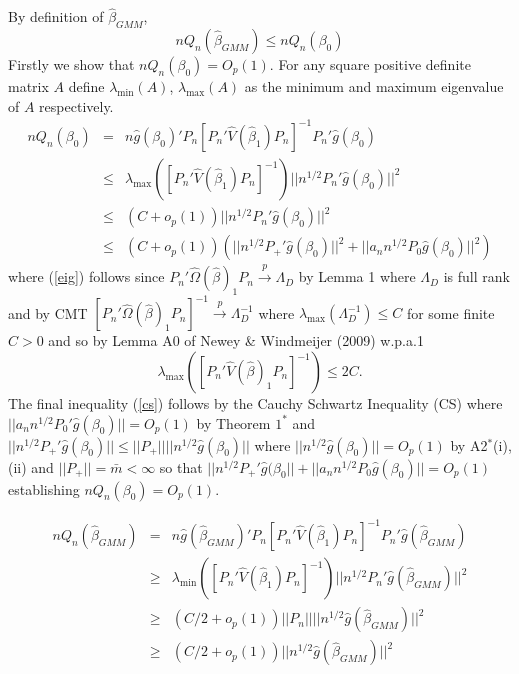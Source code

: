 \documentclass[11pt, fleqn]{article}
\begin{document}
By definition of $\hat{\beta}_{GMM}$,
\begin{equation} nQ_{n}(\hat{\beta}_{GMM})\leq  nQ_{n}(\beta_0)\end{equation}
Firstly we show that $nQ_{n}(\beta_0)=O_p(1)$. For any square positive definite matrix $A$ define $\lambda_{\min}(A)$, $\lambda_{\max}(A)$ as the minimum and maximum eigenvalue of $A$ respectively.
\begin{eqnarray}
nQ_n(\beta_0)&=&n\hat{g}(\beta_0)'P_n[P_n'\hat{V}(\hat{\beta}_1)P_n]^{-1}P_n'\hat{g}(\beta_0)  \label{ok}\\
&\leq & \lambda_{\max}\left([P_n'\hat{V}(\hat{\beta}_1)P_n]^{-1}\right)|\!|n^{1/2}P_n'\hat{g}(\beta_0)|\!|^2 \\
&\leq &(C+o_p(1))|\!|n^{1/2}P_n'\hat{g}(\beta_0)|\!|^2 \label{eig}\\
&\leq  &(C+o_p(1))\left(|\!|n^{1/2}P_+'\hat{g}(\beta_0)|\!|^2 +|\!|a_nn^{1/2}P_0\hat{g}(\beta_0)|\!|^2\right)\label{cs}
\end{eqnarray} 
where (\ref{eig}) follows since  $P_n'\hat{\Omega}(\hat{\beta})_1P_n\overset{p}{\rightarrow} \Lambda_D$  by Lemma 1 where $\Lambda_D$ is full rank and by CMT $[P_n'\hat{\Omega}(\hat{\beta})_1P_n]^{-1}\overset{p}{\rightarrow} \Lambda_D^{-1}$ where $\lambda_{\max}(\Lambda_D^{-1})\leq C$ for some finite $C>0$ and so by Lemma A0 of Newey \& Windmeijer (2009) w.p.a.1
\begin{equation}\lambda_{\max}([P_n'\hat{V}(\hat{\beta})_1P_n]^{-1})\leq 2C. \end{equation}
The final inequality (\ref{cs}) follows by the Cauchy Schwartz Inequality (CS) where\\
$ |\!|a_nn^{1/2}P_0'\hat{g}(\beta_0)|\!| =O_p(1)$ by Theorem $1^*$ and $
 |\!|n^{1/2}P_+'\hat{g}(\beta_0)|\!|\leq |\!|P_+|\!| |\!|n^{1/2}\hat{g}(\beta_0)|\!|$ where $|\!|n^{1/2}\hat{g}(\beta_0)|\!|=O_p(1)$ by A2$^*$(i), (ii) and $|\!|P_+|\!|=\bar{m}<\infty$ so that $|\!|n^{1/2}P_+'\hat{g}(\beta_0|\!|+|\!|a_nn^{1/2}P_0\hat{g}(\beta_0)|\!|=O_p(1)$ establishing $nQ_n(\beta_0)=O_p(1)$.
 

  \begin{eqnarray}
 nQ_n(\hat{\beta}_{GMM})
 &=&n\hat{g}(\hat{\beta}_{GMM})'P_n[P_n'\hat{V}(\hat{\beta}_1)P_n]^{-1}P_n'\hat{g}(\hat{\beta}_{GMM}) \\
 &\geq&\lambda_{\min}\left([P_n'\hat{V}(\hat{\beta}_1)P_n]^{-1}\right) |\!|n^{1/2}P_n'\hat{g}(\hat{\beta}_{GMM})|\!|^2\\
  &\geq& (C/2+o_p(1))|\!|P_n|\!||\!|n^{1/2}\hat{g}(\hat{\beta}_{GMM})|\!|^2 \label{kj}\\
    &\geq&(C/2+o_p(1))|\!|n^{1/2}\hat{g}(\hat{\beta}_{GMM})|\!|^2 \label{pl}
  \end{eqnarray}
 
\end{document}
